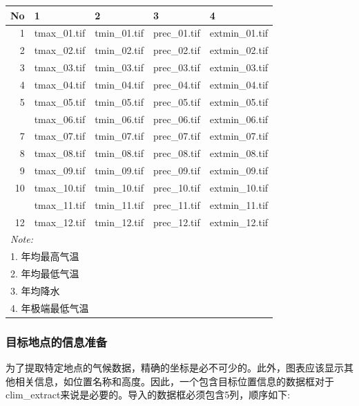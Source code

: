 \documentclass[
]{ctexart}
\begin{document}
\begin{tabular}{rllll}
\toprule
No & 1 & 2 & 3 & 4\\
\midrule
1 & tmax\_01.tif & tmin\_01.tif & prec\_01.tif & extmin\_01.tif\\
2 & tmax\_02.tif & tmin\_02.tif & prec\_02.tif & extmin\_02.tif\\
3 & tmax\_03.tif & tmin\_03.tif & prec\_03.tif & extmin\_03.tif\\
4 & tmax\_04.tif & tmin\_04.tif & prec\_04.tif & extmin\_04.tif\\
5 & tmax\_05.tif & tmin\_05.tif & prec\_05.tif & extmin\_05.tif\\
\addlinespace
6 & tmax\_06.tif & tmin\_06.tif & prec\_06.tif & extmin\_06.tif\\
7 & tmax\_07.tif & tmin\_07.tif & prec\_07.tif & extmin\_07.tif\\
8 & tmax\_08.tif & tmin\_08.tif & prec\_08.tif & extmin\_08.tif\\
9 & tmax\_09.tif & tmin\_09.tif & prec\_09.tif & extmin\_09.tif\\
10 & tmax\_10.tif & tmin\_10.tif & prec\_10.tif & extmin\_10.tif\\
\addlinespace
11 & tmax\_11.tif & tmin\_11.tif & prec\_11.tif & extmin\_11.tif\\
12 & tmax\_12.tif & tmin\_12.tif & prec\_12.tif & extmin\_12.tif\\
\bottomrule
\multicolumn{5}{l}{\rule{0pt}{1em}\textit{Note: }}\\
\multicolumn{5}{l}{\rule{0pt}{1em}1. 年均最高气温}\\
\multicolumn{5}{l}{\rule{0pt}{1em}2. 年均最低气温}\\
\multicolumn{5}{l}{\rule{0pt}{1em}3. 年均降水}\\
\multicolumn{5}{l}{\rule{0pt}{1em}4. 年极端最低气温}\\
\end{tabular}

\hypertarget{ux76eeux6807ux5730ux70b9ux7684ux4fe1ux606fux51c6ux5907}{%
\subsubsection{目标地点的信息准备}\label{ux76eeux6807ux5730ux70b9ux7684ux4fe1ux606fux51c6ux5907}}

为了提取特定地点的气候数据，精确的坐标是必不可少的。此外，图表应该显示其他相关信息，如位置名称和高度。因此，一个包含目标位置信息的数据框对于clim\_extract来说是必要的。导入的数据框必须包含5列，顺序如下:
\end{document}
